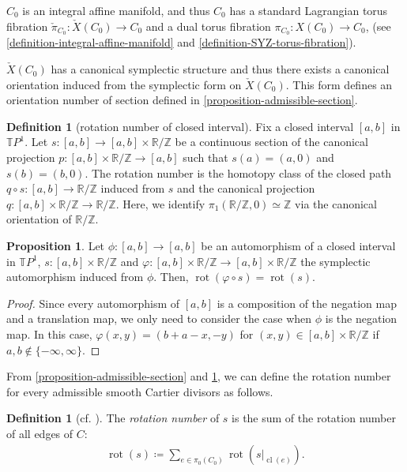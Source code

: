 \documentclass[a4paper,dvipdfmx,reqno,12pt]{amsart}
\theoremstyle{definition}
\newtheorem{definition}[theorem]{Definition}
\newtheorem{proposition}[theorem]{Proposition}
\newcommand{\deq}{\coloneqq}
\newcommand{\opn}[1]{\operatorname{#1}}
\numberwithin{equation}{section}
\begin{document}
$C_0$ is an integral affine manifold, 
and thus $C_0$ has a standard Lagrangian torus fibration
$\check{\pi}_{C_0}\colon \check{X}(C_0)\to C_0$ and
a dual torus fibration 
$\pi_{C_0}\colon X(C_0)\to C_0$,
(see \cref{definition-integral-affine-manifold}
and \cref{definition-SYZ-torus-fibration}).

$\check{X}(C_0)$ has a canonical symplectic structure
and thus there exists a canonical orientation induced
from the symplectic form on $\check{X}(C_0)$.
This form defines an orientation number of 
section defined in \cref{proposition-admissible-section}.

\begin{definition}[{rotation number of closed interval}]
Fix a closed interval $[a,b]$ in $\mathbb{T}P^{1}$.
Let $s\colon [a,b]\to [a,b]\times \mathbb{R}/\mathbb{Z}$ be 
a continuous section of the canonical projection
$p\colon [a,b]\times \mathbb{R}/\mathbb{Z} \to [a,b]$
such that $s(a)=(a,0)$ and $s(b)=(b,0)$. 
The rotation number
is the homotopy class of the closed path
$q\circ s\colon [a,b]\to \mathbb{R}/\mathbb{Z}$
induced from $s$ and the canonical projection
$q\colon [a,b]\times \mathbb{R}/\mathbb{Z} 
\to \mathbb{R}/\mathbb{Z}$. Here, 
we identify $\pi_1(\mathbb{R}/\mathbb{Z},0)\simeq \mathbb{Z}$
via the canonical orientation of $\mathbb{R}/\mathbb{Z}$.
\end{definition}

\begin{proposition} \label{proposition-rotation-number}
Let 
$\phi \colon [a,b] \to [a,b]$ be an automorphism of 
a closed interval in $\mathbb{T}P^{1}$, 
$s\colon [a,b]\times \mathbb{R}/\mathbb{Z}$ and 
$\varphi \colon [a,b]\times \mathbb{R}/\mathbb{Z} \to 
[a,b]\times \mathbb{R}/\mathbb{Z}$ 
the symplectic automorphism induced from $\phi$.
Then, $\opn{rot}(\varphi\circ s)=\opn{rot}(s)$.
\end{proposition}
\begin{proof}
Since every automorphism of 
$[a,b]$ is a composition of the negation map 
and a translation map, we only need to consider the case
when $\phi$ is the negation map.
In this case, $\varphi(x,y)=(b+a-x,-y)$ for 
$(x,y)\in [a,b]\times \mathbb{R}/\mathbb{Z}$ if 
$a,b\notin \{-\infty,\infty\}$.
\end{proof}


From \cref{proposition-admissible-section} and \cref{proposition-rotation-number}, we can define the 
rotation number for every admissible smooth 
Cartier divisors as follows.
\begin{definition}[{cf. \cite{auroux2022lagrangian}}]
The \emph{rotation number} of $s$ is the sum of
the rotation number of all edges of $C$: 
\begin{align}
\opn{rot}(s)\deq \sum_{e\in \pi_0(C_0)}
\opn{rot}(s|_{\opn{cl}(e)}).
\end{align}

\end{definition}
\end{document}
